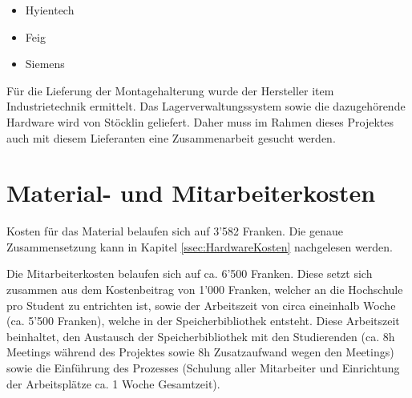 \begin{itemize}
	\item Hyientech
	\item Feig
	\item Siemens
\end{itemize}

\noindent
Für die Lieferung der Montagehalterung wurde der Hersteller item Industrietechnik ermittelt. Das Lagerverwaltungssystem sowie die dazugehörende Hardware wird von Stöcklin geliefert. Daher muss im Rahmen dieses Projektes auch mit diesem Lieferanten eine Zusammenarbeit gesucht werden.

\section{Material- und Mitarbeiterkosten}
\label{sec:MaterialMitarbeiterKosten}
Kosten für das Material belaufen sich auf 3'582 Franken. Die genaue Zusammensetzung kann in Kapitel \ref{ssec:HardwareKosten} nachgelesen werden.

Die Mitarbeiterkosten belaufen sich auf ca. 6'500 Franken. Diese setzt sich zusammen aus dem Kostenbeitrag von 1'000 Franken, welcher an die Hochschule pro Student zu entrichten ist, sowie der Arbeitszeit von circa eineinhalb Woche (ca. 5'500 Franken), welche in der Speicherbibliothek entsteht. Diese Arbeitszeit beinhaltet, den Austausch der Speicherbibliothek mit den Studierenden (ca. 8h Meetings während des Projektes sowie 8h Zusatzaufwand wegen den Meetings) sowie die Einführung des Prozesses (Schulung aller Mitarbeiter und Einrichtung der Arbeitsplätze ca. 1 Woche Gesamtzeit).
